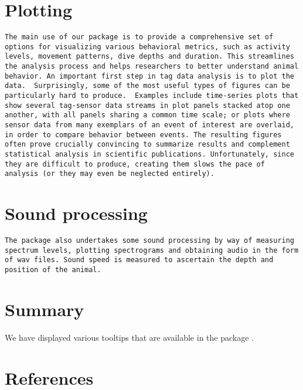 \hypertarget{plotting}{%
\section{Plotting}\label{plotting}}

\begin{verbatim}
The main use of our package is to provide a comprehensive set of options for visualizing various behavioral metrics, such as activity levels, movement patterns, dive depths and duration. This streamlines the analysis process and helps researchers to better understand animal behavior. An important first step in tag data analysis is to plot the data.  Surprisingly, some of the most useful types of figures can be particularly hard to produce.  Examples include time-series plots that show several tag-sensor data streams in plot panels stacked atop one another, with all panels sharing a common time scale; or plots where sensor data from many exemplars of an event of interest are overlaid, in order to compare behavior between events. The resulting figures often prove crucially convincing to summarize results and complement statistical analysis in scientific publications. Unfortunately, since they are difficult to produce, creating them slows the pace of analysis (or they may even be neglected entirely).
\end{verbatim}

\hypertarget{sound-processing}{%
\section{Sound processing}\label{sound-processing}}

\begin{verbatim}
The package also undertakes some sound processing by way of measuring spectrum levels, plotting spectrograms and obtaining audio in the form of wav files. Sound speed is measured to ascertain the depth and position of the animal. 
\end{verbatim}

\hypertarget{summary}{%
\section{Summary}\label{summary}}

We have displayed various tooltips that are available in the package .

\hypertarget{references}{%
\section*{References}\label{references}}

